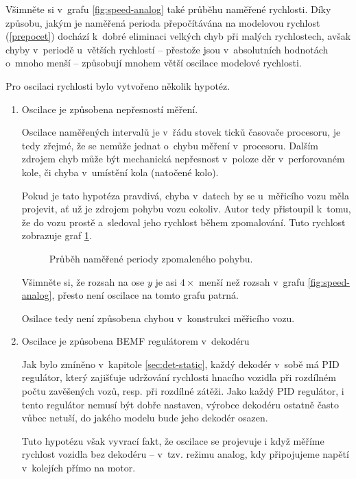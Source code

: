 Všimněte si v~grafu \ref{fig:speed-analog} také průběhu naměřené rychlosti.
Díky způsobu, jakým je naměřená perioda přepočítávána na modelovou rychlost
(\ref{prepocet}) dochází k~dobré eliminaci velkých chyb při malých rychlostech,
avšak chyby v~periodě u~větších rychlostí -- přestože jsou v~absolutních
hodnotách o~mnoho menší -- způsobují mnohem větší oscilace modelové rychlosti.

Pro oscilaci rychlosti bylo vytvořeno několik hypotéz.

\begin{enumerate}
\item Oscilace je způsobena nepřesností měření.

Oscilace naměřených intervalů je v~řádu stovek ticků časovače procesoru, je tedy
zřejmé, že se nemůže jednat o~chybu měření v~procesoru. Dalším zdrojem chyb
může být mechanická nepřesnost v~poloze děr v~perforovaném kole, či chyba
v~umístění kola (natočené kolo).

Pokud je tato hypotéza pravdivá, chyba v~datech by se u~měřicího vozu měla
projevit, ať už je zdrojem pohybu vozu cokoliv. Autor tedy přistoupil k~tomu,
že do vozu prostě  a~sledoval jeho rychlost během zpomalování.
Tuto rychlost zobrazuje graf \ref{fig:speed-zduch}.

\begin{figure}[h]

\caption{Průběh naměřené periody zpomaleného pohybu.}
\label{fig:speed-zduch}
\end{figure}

Všimněte si, že rozsah na ose $y$ je asi $4 \times$ menší než rozsah v~grafu
\ref{fig:speed-analog}, přesto není oscilace na tomto grafu patrná.

Osilace tedy není způsobena chybou v~konstrukci měřicího vozu.

\item Oscilace je způsobena BEMF regulátorem v~dekodéru

Jak bylo zmíněno v~kapitole \ref{sec:det-static}, každý dekodér v~sobě má PID
regulátor, který zajišťuje udržování rychlosti hnacího vozidla při rozdílném
počtu zavěšených vozů, resp. při rozdílné zátěži. Jako každý PID regulátor,
i tento regulátor nemusí být dobře nastaven, výrobce dekodéru ostatně často
vůbec netuší, do jakého modelu bude jeho dekodér osazen.

Tuto hypotézu však vyvrací fakt, že oscilace se projevuje i když měříme rychlost
vozidla bez dekodéru -- v~tzv. režimu analog, kdy připojujeme napětí v~kolejích
přímo na motor.


\end{enumerate}
